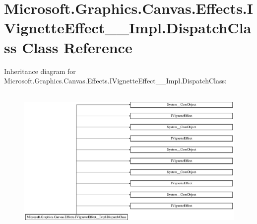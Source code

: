 \hypertarget{class_microsoft_1_1_graphics_1_1_canvas_1_1_effects_1_1_i_vignette_effect_____impl_1_1_dispatch_class}{}\section{Microsoft.\+Graphics.\+Canvas.\+Effects.\+I\+Vignette\+Effect\+\_\+\+\_\+\+Impl.\+Dispatch\+Class Class Reference}
\label{class_microsoft_1_1_graphics_1_1_canvas_1_1_effects_1_1_i_vignette_effect_____impl_1_1_dispatch_class}
Inheritance diagram for Microsoft.\+Graphics.\+Canvas.\+Effects.\+I\+Vignette\+Effect\+\_\+\+\_\+\+Impl.\+Dispatch\+Class\+:\begin{figure}[H]
\begin{center}
\leavevmode
\includegraphics[height=7.264151cm]{class_microsoft_1_1_graphics_1_1_canvas_1_1_effects_1_1_i_vignette_effect_____impl_1_1_dispatch_class}
\end{center}
\end{figure}
